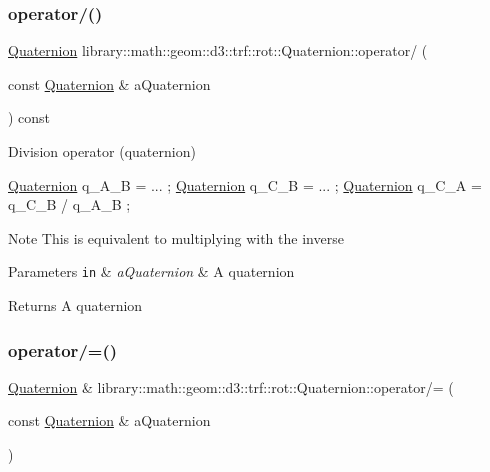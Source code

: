 \subsubsection{\texorpdfstring{operator/()}{operator/()}}
{\footnotesize\ttfamily \hyperlink{classlibrary_1_1math_1_1geom_1_1d3_1_1trf_1_1rot_1_1_quaternion}{Quaternion} library\+::math\+::geom\+::d3\+::trf\+::rot\+::\+Quaternion\+::operator/ (\begin{DoxyParamCaption}\item[{const \hyperlink{classlibrary_1_1math_1_1geom_1_1d3_1_1trf_1_1rot_1_1_quaternion}{Quaternion} \&}]{a\+Quaternion }\end{DoxyParamCaption}) const}



Division operator (quaternion) 


\begin{DoxyCode}
\hyperlink{classlibrary_1_1math_1_1geom_1_1d3_1_1trf_1_1rot_1_1_quaternion_a1b8794cce68c5ee86dd50f9ba53635fa}{Quaternion} q\_A\_B = ... ;
\hyperlink{classlibrary_1_1math_1_1geom_1_1d3_1_1trf_1_1rot_1_1_quaternion_a1b8794cce68c5ee86dd50f9ba53635fa}{Quaternion} q\_C\_B = ... ;
\hyperlink{classlibrary_1_1math_1_1geom_1_1d3_1_1trf_1_1rot_1_1_quaternion_a1b8794cce68c5ee86dd50f9ba53635fa}{Quaternion} q\_C\_A = q\_C\_B / q\_A\_B ;
\end{DoxyCode}


\begin{DoxyNote}{Note}
This is equivalent to multiplying with the inverse
\end{DoxyNote}

\begin{DoxyParams}[1]{Parameters}
\mbox{\tt in}  & {\em a\+Quaternion} & A quaternion \\
\hline
\end{DoxyParams}
\begin{DoxyReturn}{Returns}
A quaternion 
\end{DoxyReturn}
\mbox{\label{classlibrary_1_1math_1_1geom_1_1d3_1_1trf_1_1rot_1_1_quaternion_af3b5e885a6ea4700d9404a58860ff250}} 
\subsubsection{\texorpdfstring{operator/=()}{operator/=()}}
{\footnotesize\ttfamily \hyperlink{classlibrary_1_1math_1_1geom_1_1d3_1_1trf_1_1rot_1_1_quaternion}{Quaternion} \& library\+::math\+::geom\+::d3\+::trf\+::rot\+::\+Quaternion\+::operator/= (\begin{DoxyParamCaption}\item[{const \hyperlink{classlibrary_1_1math_1_1geom_1_1d3_1_1trf_1_1rot_1_1_quaternion}{Quaternion} \&}]{a\+Quaternion }\end{DoxyParamCaption})}



